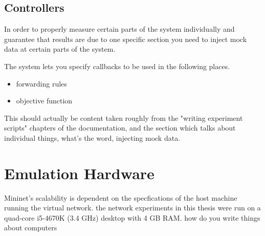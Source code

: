 \subsection{Controllers}
In order to properly measure certain parts of the system individually and guarantee that results are due to one specific section you need to inject mock data at certain parts of the system.

The system lets you specify callbacks to be used in the following places.

\begin{itemize}
\item forwarding rules
\item objective function
\end{itemize}

This should actually be content taken roughly from the "writing experiment scripts" chapters of the documentation, and the section which talks about individual things, what's the word, injecting mock data.

\section{Emulation Hardware}

Mininet's scalability is dependent on the specfications of the host machine running the virtual network. the network experiments in this thesis were run on a quad-core i5-4670K (3.4 GHz) desktop with 4 GB RAM. how do you write things about computers
